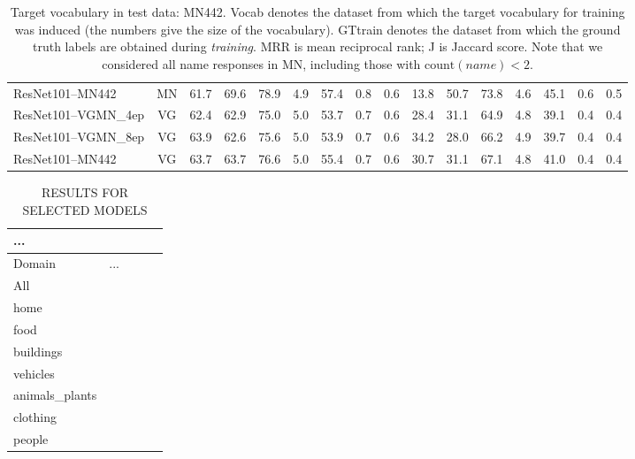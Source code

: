 \begin{table}[t]
\begin{tabular}{l|c|r@{~}r@{~}r@{~}r@{~}r@{~}r@{~}r|@{~}r@{~}r@{~}r@{~}r@{~}r@{~}r@{~}r@{~}}
		ResNet101--MN442 & MN &            61.7 &              69.6 &                78.9 &         4.9 &             57.4 &          0.8 &             0.6 &            13.8 &              50.7 &                73.8 &         4.6 &             45.1 &          0.6 &             0.5 \\
		ResNet101--VGMN\_4ep  &   VG &  62.4 &              62.9 &                75.0 &         5.0 &             53.7 &          0.7 &             0.6 &            28.4 &              31.1 &                64.9 &         4.8 &             39.1 &          0.4 &             0.4 \\
		ResNet101--VGMN\_8ep & VG &            63.9 &              62.6 &                75.6 &         5.0 &             53.9 &          0.7 &             0.6 &            34.2 &              28.0 &                66.2 &         4.9 &             39.7 &          0.4 &             0.4 \\
		ResNet101--MN442 & VG  &            63.7 &              63.7 &                76.6 &         5.0 &             55.4 &          0.7 &             0.6 &            30.7 &              31.1 &                67.1 &         4.8 &             41.0 &          0.4 &             0.4 \\
		\bottomrule
	\end{tabular}
	\caption{Target vocabulary in test data: MN442. Vocab denotes the dataset from which the target vocabulary for training was induced (the numbers give the size of the vocabulary). GTtrain denotes the dataset from which the ground truth labels are obtained during \textit{training}. MRR is mean reciprocal rank; J is Jaccard score. Note that we considered all name responses in MN, including those with $\text{count}(name)<2$\label{tab:entrylevels}. }
\end{table}


\begin{table}[t]
	\centering
	\small
	\begin{tabular}{l@{~}|rrrr}
		\toprule
		... \\
		\midrule
		Domain	 & ... \\ 
		\midrule
		All           \\
		home           \\
		food           \\
		buildings      \\
		vehicles       \\
		animals\_plants \\
		clothing       \\
		people         \\
		\bottomrule
	\end{tabular}
	\caption{RESULTS FOR SELECTED MODELS \label{tab:domains_bestmodel}}
\end{table}

